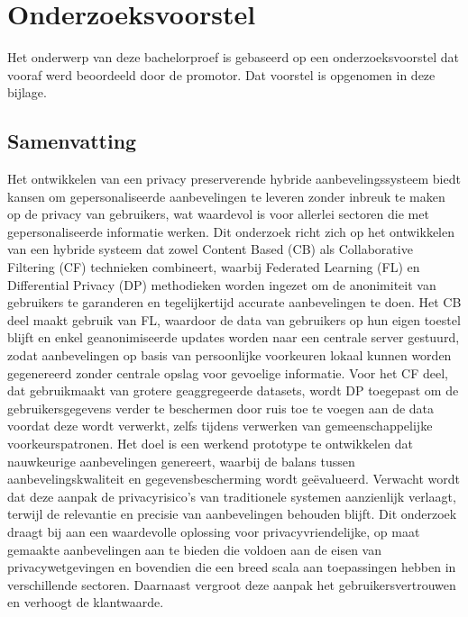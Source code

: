 \documentclass[dutch,dit,thesis]{hogentreport}
\begin{document}





%
%




\appendix

\chapter{Onderzoeksvoorstel}

Het onderwerp van deze bachelorproef is gebaseerd op een onderzoeksvoorstel dat vooraf werd beoordeeld door de promotor. Dat voorstel is opgenomen in deze bijlage.
\section*{Samenvatting}

Het ontwikkelen van een privacy preserverende hybride aanbevelingssysteem biedt kansen om gepersonaliseerde aanbevelingen te leveren zonder inbreuk te maken op de privacy van gebruikers, wat waardevol is voor allerlei sectoren die met gepersonaliseerde informatie werken. Dit onderzoek richt zich op het ontwikkelen van een hybride systeem dat zowel Content Based (CB) als Collaborative Filtering (CF) technieken combineert, waarbij Federated Learning (FL) en Differential Privacy (DP) methodieken worden ingezet om de anonimiteit van gebruikers te garanderen en tegelijkertijd accurate aanbevelingen te doen. Het CB deel maakt gebruik van FL, waardoor de data van gebruikers op hun eigen toestel blijft en enkel geanonimiseerde updates worden naar een centrale server gestuurd, zodat aanbevelingen op basis van persoonlijke voorkeuren lokaal kunnen worden gegenereerd zonder centrale opslag voor gevoelige informatie. Voor het CF deel, dat gebruikmaakt van grotere geaggregeerde datasets, wordt DP toegepast om de gebruikersgegevens verder te beschermen door ruis toe te voegen aan de data voordat deze wordt verwerkt, zelfs tijdens verwerken van gemeenschappelijke voorkeurspatronen. Het doel is een werkend prototype te ontwikkelen dat nauwkeurige aanbevelingen genereert, waarbij de balans tussen aanbevelingskwaliteit en gegevensbescherming wordt geëvalueerd. Verwacht wordt dat deze aanpak de privacyrisico's van traditionele systemen aanzienlijk verlaagt, terwijl de relevantie en precisie van aanbevelingen behouden blijft. Dit onderzoek draagt bij aan een waardevolle oplossing voor privacyvriendelijke, op maat gemaakte aanbevelingen aan te bieden die voldoen aan de eisen van privacywetgevingen en bovendien die een breed scala aan toepassingen hebben in verschillende sectoren. Daarnaast vergroot deze aanpak het gebruikersvertrouwen en verhoogt de klantwaarde.
\end{document}
